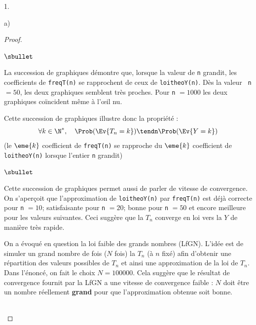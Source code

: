 \begin{noliste}{1.}
\begin{noliste}{a)}
\begin{proof}
\begin{noliste}{$\sbullet$}
      \item La succession de graphiques démontre que, lorsque la valeur
        de {\tt n} grandit, les coefficients de {\tt freqT(n)} se
        rapprochent de ceux de {\tt loitheoY(n)}. Dès la valeur {\tt
          n} $= 50$, les deux graphiques semblent très proches. Pour
        {\tt n} $= 1000$ les deux graphiques coïncident même à
        l'\oe{}il nu.

      \item Cette succession de graphiques illustre donc la propriété :
        \[
        \forall k \in \N^*, \quad \Prob(\Ev{T_n = k}) \tendn
        \Prob(\Ev{Y = k})
        \]
        (le $\eme{k}$ coefficient de {\tt freqT(n)} se rapproche du
        $\eme{k}$ coefficient de {\tt loitheoY(n)} lorsque l'entier
        {\tt n} grandit)
      \end{noliste}
      \begin{remark}%
        \begin{noliste}{$\sbullet$}
        \item Cette succession de graphiques permet aussi de parler de
          vitesse de convergence. On s'aperçoit que l'approximation de
          {\tt loitheoY(n)} par {\tt freqT(n)} est déjà correcte pour
          {\tt n} $=10$; satisfaisante pour {\tt n} $=20$; bonne pour
          {\tt n} $=50$ et encore meilleure pour les valeurs
          suivantes. Ceci suggère que la \var $T_n$ converge en loi
          vers la \var $Y$ de manière très rapide.
        \item On a évoqué en question  la loi faible des
          grands nombres (LfGN). L'idée est de simuler un grand nombre
          de fois ($N$ fois) la \var $T_n$ (à $n$ fixé) afin d'obtenir
          une répartition des valeurs possibles de $T_n$ et ainsi une
          approximation de la loi de $T_n$. Dans l'énoncé, on fait le
          choix $N = 100000$. Cela suggère que le résultat de
          convergence fournit par la LfGN a une vitesse de convergence
          faible : $N$ doit être un nombre réellement {\bf grand} pour
          que l'approximation obtenue soit bonne.
        \end{noliste}
      \end{remark}~\\[-1.4cm]
    \end{proof}    
  \end{noliste}
\end{noliste}


